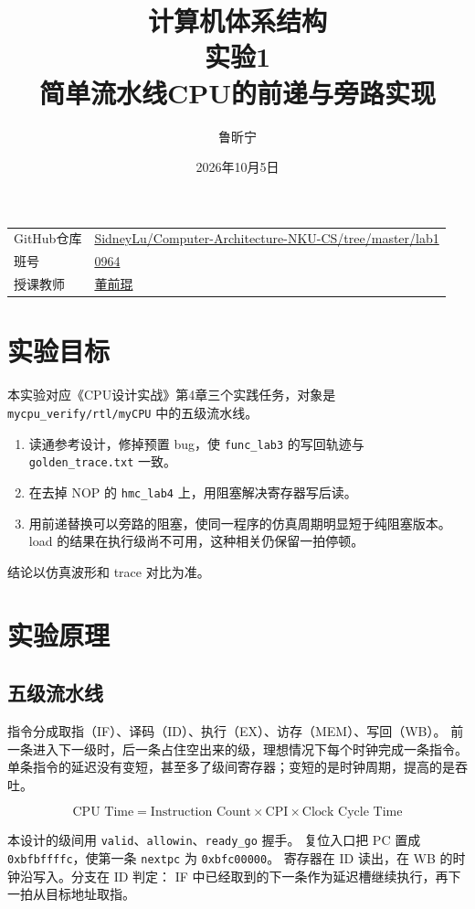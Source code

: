 \documentclass{article}
\title{计算机体系结构\\实验1\\简单流水线CPU的前递与旁路实现}
\author{鲁昕宁 \quad 2414015}
\date{2026年10月5日}
\begin{document}
\maketitle
\begin{center}
\begin{tabular}{ll}
GitHub仓库 & \url{SidneyLu/Computer-Architecture-NKU-CS/tree/master/lab1} \\[0.6em]
班号 & \underline{0964} \\[0.6em]
授课教师 & \underline{董前琨} \\[0.6em]
\end{tabular}
\end{center}

\newpage

\section{实验目标}
本实验对应《CPU设计实战》第4章三个实践任务，对象是
\texttt{mycpu\_verify/rtl/myCPU} 中的五级流水线。

\begin{enumerate}
  \item 读通参考设计，修掉预置 bug，使 \texttt{func\_lab3} 的写回轨迹与
        \texttt{golden\_trace.txt} 一致。
  \item 在去掉 NOP 的 \texttt{hmc\_lab4} 上，用阻塞解决寄存器写后读。
  \item 用前递替换可以旁路的阻塞，使同一程序的仿真周期明显短于纯阻塞版本。
        load 的结果在执行级尚不可用，这种相关仍保留一拍停顿。
\end{enumerate}

结论以仿真波形和 trace 对比为准。

\section{实验原理}
\subsection{五级流水线}
指令分成取指（IF）、译码（ID）、执行（EX）、访存（MEM）、写回（WB）。
前一条进入下一级时，后一条占住空出来的级，理想情况下每个时钟完成一条指令。
单条指令的延迟没有变短，甚至多了级间寄存器；变短的是时钟周期，提高的是吞吐。

\[
\text{CPU Time} = \text{Instruction Count} \times \text{CPI} \times \text{Clock Cycle Time}
\]

本设计的级间用 \texttt{valid}、\texttt{allowin}、\texttt{ready\_go} 握手。
复位入口把 PC 置成 \texttt{0xbfbffffc}，使第一条 \texttt{nextpc} 为 \texttt{0xbfc00000}。
寄存器在 ID 读出，在 WB 的时钟沿写入。分支在 ID 判定：
IF 中已经取到的下一条作为延迟槽继续执行，再下一拍从目标地址取指。
\end{document}
